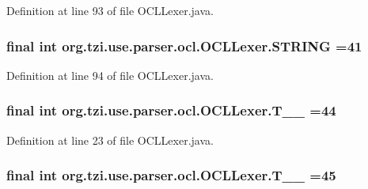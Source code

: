 Definition at line 93 of file O\-C\-L\-Lexer.\-java.

\hypertarget{classorg_1_1tzi_1_1use_1_1parser_1_1ocl_1_1_o_c_l_lexer_a5acdcf2f44472f65e1218a3226882ba2}{
\subsubsection[{S\-T\-R\-I\-N\-G}]{\setlength{\rightskip}{0pt plus 5cm}final int org.\-tzi.\-use.\-parser.\-ocl.\-O\-C\-L\-Lexer.\-S\-T\-R\-I\-N\-G =41\hspace{0.3cm}{\ttfamily [static]}}}\label{classorg_1_1tzi_1_1use_1_1parser_1_1ocl_1_1_o_c_l_lexer_a5acdcf2f44472f65e1218a3226882ba2}


Definition at line 94 of file O\-C\-L\-Lexer.\-java.

\hypertarget{classorg_1_1tzi_1_1use_1_1parser_1_1ocl_1_1_o_c_l_lexer_ae9e27692461af529b9607545f9823365}{
\subsubsection[{T\-\_\-\-\_\-44}]{\setlength{\rightskip}{0pt plus 5cm}final int org.\-tzi.\-use.\-parser.\-ocl.\-O\-C\-L\-Lexer.\-T\-\_\-\-\_ =44\hspace{0.3cm}{\ttfamily [static]}}}\label{classorg_1_1tzi_1_1use_1_1parser_1_1ocl_1_1_o_c_l_lexer_ae9e27692461af529b9607545f9823365}


Definition at line 23 of file O\-C\-L\-Lexer.\-java.

\hypertarget{classorg_1_1tzi_1_1use_1_1parser_1_1ocl_1_1_o_c_l_lexer_ac03ed4f056fa8a8d024afd2fee62f8fb}{
\subsubsection[{T\-\_\-\-\_\-45}]{\setlength{\rightskip}{0pt plus 5cm}final int org.\-tzi.\-use.\-parser.\-ocl.\-O\-C\-L\-Lexer.\-T\-\_\-\-\_ =45\hspace{0.3cm}{\ttfamily [static]}}}\label{classorg_1_1tzi_1_1use_1_1parser_1_1ocl_1_1_o_c_l_lexer_ac03ed4f056fa8a8d024afd2fee62f8fb}



